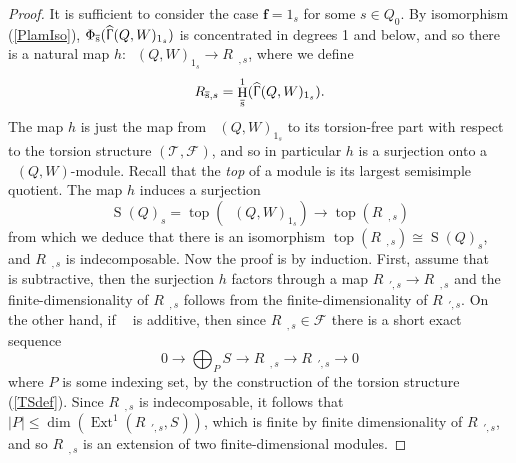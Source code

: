 \documentclass[a4paper,10pt]{amsart}
\newcommand{\ff}{\mathbf{f}}
\DeclareMathOperator{\Simp}{S}
\DeclareMathOperator{\Top}{top}
\renewcommand{\Gamma}{\Upgamma}
\DeclareMathOperator{\Ext}{Ext}
\DeclareMathOperator{\HJac}{\widehat{Jac}}
\DeclareMathOperator{\HGamma}{\widehat{\Gamma}}
\DeclareMathOperator{\Ss}{\overline{s}}
\DeclareMathOperator{\HO}{H}
\begin{document}
\begin{proof}
It is sufficient to consider the case $\ff=1_s$ for some $s\in Q_0$.  By isomorphism (\ref{PlamIso}), $\Phi_{\Ss}(\HGamma(Q,W)_{1_s})$ is concentrated in degrees 1 and below, and so there is a natural map $h\colon\HJac(Q,W)_{1_s}\rightarrow R_{\Ss,s}$, where we define 
\[
R_{\Ss,s}=\HO^1_{\Ss}(\HGamma(Q,W)_{1_s}).
\]
The map $h$ is just the map from $\HJac(Q,W)_{1_s}$ to its torsion-free part with respect to the torsion structure $(\mathcal{T}_{\Ss},\mathcal{F}_{\Ss})$, and so in particular $h$ is a surjection onto a $\HJac(Q,W)$-module.  Recall that the \textit{top} of a module is its largest semisimple quotient.  The map $h$ induces a surjection
\[
\Simp(Q)_s=\Top\left(\HJac(Q,W)_{1_s}\right)\rightarrow \Top\left(R_{\Ss,s}\right)
\]
from which we deduce that there is an isomorphism $\Top(R_{\Ss,s})\cong\Simp(Q)_s$, and $R_{\Ss,s}$ is indecomposable.  Now the proof is by induction.  First, assume that $\Ss$ is subtractive, then the surjection $h$ factors through a map $R_{\Ss',s}\rightarrow R_{\Ss,s}$ and the finite-dimensionality of $R_{\Ss,s}$ follows from the finite-dimensionality of $R_{\Ss',s}$.  On the other hand, if $\Ss$ is additive, then since $R_{\Ss,s}\in\mathcal{F}_{\Ss}$ there is a short exact sequence
\[
0\rightarrow \bigoplus_{P}S_{\Ss}\rightarrow R_{\Ss,s}\rightarrow R_{\Ss',s}\rightarrow 0
\]
where $P$ is some indexing set, by the construction of the torsion structure (\ref{TSdef}).  Since $R_{\Ss,s}$ is indecomposable, it follows that $|P|\leq \dim(\Ext^1(R_{\Ss',s},S_{\Ss}))$, which is finite by finite dimensionality of $R_{\Ss',s}$, and so $R_{\Ss,s}$ is an extension of two finite-dimensional modules.


\end{proof}
\end{document}
